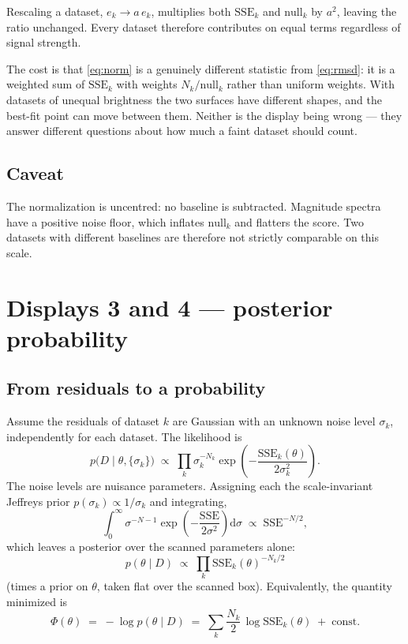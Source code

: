 \documentclass[11pt,a4paper]{article}
\newcommand{\SSE}{\mathrm{SSE}}
\begin{document}
Rescaling a dataset, $e_k \to a\,e_k$, multiplies both $\SSE_k$ and
$\mathrm{null}_k$ by $a^2$, leaving the ratio unchanged. Every dataset
therefore contributes on equal terms regardless of signal strength.

The cost is that \eqref{eq:norm} is a genuinely different statistic from
\eqref{eq:rmsd}: it is a weighted sum of $\SSE_k$ with weights
$N_k/\mathrm{null}_k$ rather than uniform weights. With datasets of unequal
brightness the two surfaces have different shapes, and the best-fit point
can move between them. Neither is the display being wrong --- they answer
different questions about how much a faint dataset should count.

\subsection{Caveat}

The normalization is uncentred: no baseline is subtracted. Magnitude
spectra have a positive noise floor, which inflates $\mathrm{null}_k$ and
flatters the score. Two datasets with different baselines are therefore not
strictly comparable on this scale.

\section{Displays 3 and 4 --- posterior probability}

\subsection{From residuals to a probability}

Assume the residuals of dataset $k$ are Gaussian with an unknown noise
level $\sigma_k$, independently for each dataset. The likelihood is
\begin{equation}
p\bigl(D \mid \theta, \{\sigma_k\}\bigr) \;\propto\;
\prod_k \sigma_k^{-N_k}
\exp\!\left(-\frac{\SSE_k(\theta)}{2\sigma_k^{2}}\right).
\end{equation}
The noise levels are nuisance parameters. Assigning each the
scale-invariant Jeffreys prior $p(\sigma_k)\propto 1/\sigma_k$ and
integrating,
\begin{equation}
\int_0^{\infty}\!\sigma^{-N-1}
\exp\!\left(-\frac{\SSE}{2\sigma^{2}}\right)\mathrm{d}\sigma
\;\propto\; \SSE^{-N/2},
\end{equation}
which leaves a posterior over the scanned parameters alone:
\begin{equation}
\boxed{\;
p(\theta \mid D) \;\propto\; \prod_k \SSE_k(\theta)^{-N_k/2}\;}
\label{eq:post}
\end{equation}
(times a prior on $\theta$, taken flat over the scanned box). Equivalently,
the quantity minimized is
\begin{equation}
\Phi(\theta) \;=\; -\log p(\theta\mid D)
\;=\; \sum_k \frac{N_k}{2}\,\log \SSE_k(\theta) \;+\; \text{const}.
\label{eq:nlp}
\end{equation}
\end{document}

